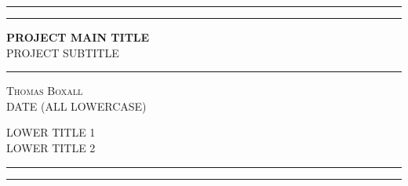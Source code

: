 \begin{titlepage} %
	
	\centering %
	
	
	\rule{\textwidth}{1pt} %
	
	\vspace{2pt}\vspace{-\baselineskip} %
	
	\rule{\textwidth}{0.4pt} %
	
	\vspace{0.1\textheight} %
	

	{\Huge \textbf{PROJECT MAIN TITLE}}\\[0.5\baselineskip] %
	{\Huge PROJECT SUBTITLE} %

	
	\vspace{0.025\textheight} %
	
	\rule{0.3\textwidth}{0.4pt} %

	\vspace{0.1\textheight} %
	
	
	{\Large \textsc{Thomas Boxall}} \\%
	{\large\textsc{DATE (ALL LOWERCASE)}} %
	
	\vfill %
	
	
	{\large\textsc{LOWER TITLE 1}} \\
	{\large\textsc{LOWER TITLE 2}}
	
	\vspace{0.1\textheight} %
	
	
	\rule{\textwidth}{0.4pt} %
	
	\vspace{2pt}\vspace{-\baselineskip} %
	
	\rule{\textwidth}{1pt} %
	
\end{titlepage}
